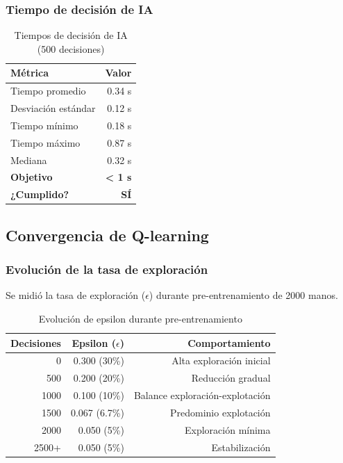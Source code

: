 \documentclass[12pt,a4paper]{article}
\begin{document}
\subsubsection{Tiempo de decisión de IA}

\begin{table}[H]
\centering
\caption{Tiempos de decisión de IA (500 decisiones)}
\begin{tabular}{|l|r|}
\hline
\textbf{Métrica} & \textbf{Valor} \\
\hline
Tiempo promedio & 0.34 s \\
\hline
Desviación estándar & 0.12 s \\
\hline
Tiempo mínimo & 0.18 s \\
\hline
Tiempo máximo & 0.87 s \\
\hline
Mediana & 0.32 s \\
\hline
\textbf{Objetivo} & \textbf{< 1 s} \\
\hline
\textbf{¿Cumplido?} & \textbf{SÍ} \\
\hline
\end{tabular}
\label{tab:tiempos_decision}
\end{table}

\subsection{Convergencia de Q-learning}

\subsubsection{Evolución de la tasa de exploración}

Se midió la tasa de exploración ($\epsilon$) durante pre-entrenamiento de 2000 manos.

\begin{table}[H]
\centering
\caption{Evolución de epsilon durante pre-entrenamiento}
\begin{tabular}{|r|r|r|}
\hline
\textbf{Decisiones} & \textbf{Epsilon ($\epsilon$)} & \textbf{Comportamiento} \\
\hline
0 & 0.300 (30\%) & Alta exploración inicial \\
\hline
500 & 0.200 (20\%) & Reducción gradual \\
\hline
1000 & 0.100 (10\%) & Balance exploración-explotación \\
\hline
1500 & 0.067 (6.7\%) & Predominio explotación \\
\hline
2000 & 0.050 (5\%) & Exploración mínima \\
\hline
2500+ & 0.050 (5\%) & Estabilización \\
\hline
\end{tabular}
\label{tab:epsilon_evolucion}
\end{table}
\end{document}
